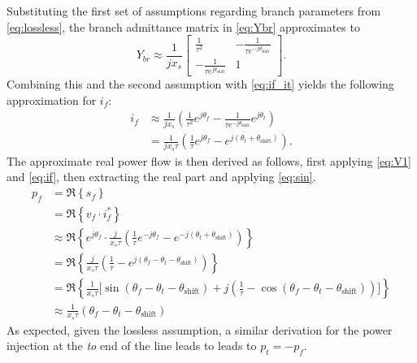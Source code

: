 \documentclass[12pt]{article}
\numberwithin{equation}{section}
\numberwithin{table}{section}
\numberwithin{figure}{section}
\begin{document}
Substituting the first set of assumptions regarding branch parameters from \eqref{eq:lossless}, the branch admittance matrix in \eqref{eq:Ybr} approximates to
\begin{equation}
Y_{br} \approx \frac{1}{j x_s}\left[\begin{array}{cc}
\frac{1}{\tau^2} &
- \frac{1}{\tau e^{-j\theta_\mathrm{shift}}} \\
- \frac{1}{\tau e^{ j\theta_\mathrm{shift}}} &
1
\end{array}\right].
\end{equation}
Combining this and the second assumption with \eqref{eq:if_it} yields the following approximation for $i_f$:
\begin{align}
i_f & \approx \frac{1}{j x_s} (\frac{1}{\tau^2} e^{j \theta_f} - \frac{1}{\tau e^{-j \theta_\mathrm{shift}}} e^{j \theta_t}) \nonumber\\
    & = \frac{1}{j x_s \tau} (\frac{1}{\tau} e^{j \theta_f} - e^{j (\theta_t + \theta_\mathrm{shift})}).
\label{eq:if}
\end{align}
The approximate real power flow is then derived as follows, first applying \eqref{eq:V1} and \eqref{eq:if}, then extracting the real part and applying \eqref{eq:sin}.
\begin{align}
p_f &= \Re \left\{ s_f \right\} \nonumber\\
&= \Re \left\{ v_f \cdot i_f^* \right\} \nonumber\\
&\approx \Re \left\{ e^{j \theta_f} \cdot \frac{j}{x_s \tau} (\frac{1}{\tau} e^{-j \theta_f}  - e^{-j (\theta_t + \theta_\mathrm{shift})}) \right\} \nonumber\\
&= \Re \left\{ \frac{j}{x_s \tau} \left(\frac{1}{\tau} - e^{j (\theta_f - \theta_t - \theta_\mathrm{shift})} \right) \right\} \nonumber\\
&= \Re \left\{ \frac{1}{x_s \tau} \bigg[ \sin(\theta_f - \theta_t - \theta_\mathrm{shift}) + j \left( \frac{1}{\tau} - \cos(\theta_f - \theta_t - \theta_\mathrm{shift}) \right) \bigg] \right\} \nonumber\\
&\approx \frac{1}{x_s \tau} (\theta_f - \theta_t - \theta_\mathrm{shift})
\end{align}
As expected, given the lossless assumption, a similar derivation for the power injection at the \emph{to} end of the line leads to leads to $p_t = -p_f$.
\end{document}
